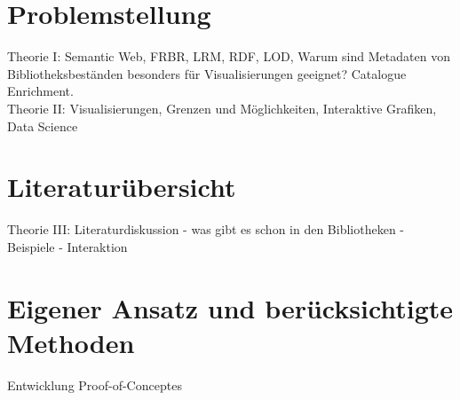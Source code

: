 \documentclass[10pt,a4paper,twocolumn,conference]{IEEEtran}
\begin{document}
\section{Problemstellung}
Theorie I: Semantic Web, FRBR, LRM, RDF, LOD, Warum sind Metadaten von
Bibliotheksbeständen besonders für Visualisierungen geeignet? Catalogue
Enrichment.\\
Theorie II: Visualisierungen, Grenzen und Möglichkeiten, Interaktive Grafiken,
Data Science

\section{Literaturübersicht}
Theorie III: Literaturdiskussion - was gibt es schon in den Bibliotheken -
Beispiele - Interaktion

\section{Eigener Ansatz und berücksichtigte Methoden}
Entwicklung Proof-of-Conceptes
\end{document}
